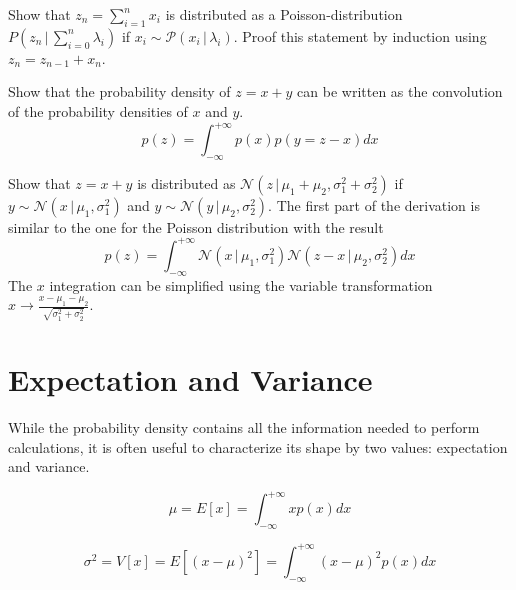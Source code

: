 \documentclass{tstextbook}
\begin{document}
\begin{exercise}
   Show that $z_n=\sum_{i=1}^{n}x_i$ is distributed as a Poisson-distribution $P\left(z_n\,\vert\,\sum_{i=0}^n\lambda_i\right)$ if $x_i\sim \mathcal{P}(x_i\,\vert \,\lambda_i)$. Proof this statement by induction using $z_n=z_{n-1}+x_n$. 
\end{exercise}

\begin{exercise}
  Show that the probability density of $z=x+y$ can be written as the convolution of the probability densities of $x$ and $y$.
  \begin{equation}
    p(z)=\int_{-\infty}^{+\infty}p\left(x\right)
    p\left(y=z-x\right)dx
  \end{equation}
  
\end{exercise}

\begin{exercise}
  Show that $z=x+y$ is distributed as 
  $\mathcal{N}\left(z\,\vert\,\mu_1+\mu_2,\sigma_1^2+\sigma_2^2\right)$ if $y\sim \mathcal{N}(x\,\vert \,\mu_1,\sigma_1^2)$ and $y\sim \mathcal{N}(y\,\vert \,\mu_2,\sigma_2^2)$. The first part of the derivation is similar to the one for the Poisson distribution with the result
  \begin{equation}
    p(z)=\int_{-\infty}^{+\infty}\mathcal{N}\left(x\,\vert\,\mu_1,\sigma_1^2\right)
    \mathcal{N}\left(z-x\,\vert\,\mu_2,\sigma_2^2\right)dx
  \end{equation}
  The $x$ integration can be simplified using the variable transformation $x\rightarrow \frac{x-\mu_1-\mu_2}{\sqrt{\sigma_1^2+\sigma_2^2}}$.
\end{exercise}

\section{Expectation and Variance}
While the probability density contains all the information needed to perform calculations, it is often useful to characterize its shape by two values: expectation and variance.

\begin{definition}[Expectation]
  \label{th:expectation}
  \begin{equation}
    \mu = E[x]=\int_{-\infty}^{+\infty}x p(x)dx
  \end{equation}
\end{definition}

\begin{definition}[Variance]
  \label{th:variance}
  \begin{equation}
    \sigma^2=V[x]=E[(x-\mu)^2]=\int_{-\infty}^{+\infty}(x-\mu)^2 p(x)dx
  \end{equation}
\end{definition}
\end{document}
